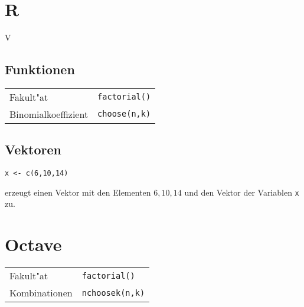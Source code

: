 \documentclass[ngerman, a4paper, 10pt, twocolumn, DIV20, headings=small]{scrartcl}
\begin{document}
\section{R}
\label{sec:r}

V

\subsection{Funktionen}
\label{sec:r-funktionen}

\begin{tabular}{l l}
  Fakult"at & \verb|factorial()| \\
  Binomialkoeffizient & \verb|choose(n,k)| \\
\end{tabular}

\subsection{Vektoren}
\label{sec:r-vektoren}

\begin{verbatim}
x <- c(6,10,14)
\end{verbatim}
erzeugt einen Vektor mit den Elementen $6, 10, 14$ und den Vektor der Variablen \verb|x| zu.

\section{Octave}
\label{sec:octave}

\begin{tabular}{l l}
  Fakult"at & \verb|factorial()| \\
  Kombinationen & \verb|nchoosek(n,k)| \\
\end{tabular}
\end{document}
